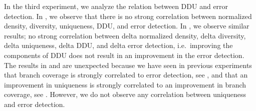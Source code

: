 \documentclass[twoside,a4paper,11pt]{memoir}
\begin{document}
In the third experiment, we analyze the relation between DDU and error detection.
In , we observe that there is no strong correlation between normalized density, diversity, uniqueness, DDU, and error detection.
In , we observe similar results; no strong correlation between delta normalized density, delta diversity, delta uniqueness, delta DDU, and delta error detection, i.e.\ improving the components of DDU does not result in an improvement in the error detection.
The results in  and  are unexpected because we have seen in previous experiments that branch coverage is strongly correlated to error detection, see , and that an improvement in uniqueness is strongly correlated to an improvement in branch coverage, see .
However, we do not observe any correlation between uniqueness and error detection.
\end{document}

